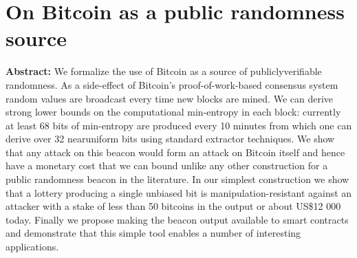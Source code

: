 \section{On Bitcoin as a public randomness source}

\textbf{Abstract:} 
We formalize the use of Bitcoin as a source of publiclyverifiable randomness. As a side-effect of Bitcoin’s proof-of-work-based consensus system random values are broadcast every time new blocks are mined. We can derive strong lower bounds on the computational min-entropy in each block: currently at least 68 bits of min-entropy are produced every 10 minutes from which one can derive over 32 nearuniform bits using standard extractor techniques. We show that any attack on this beacon would form an attack on Bitcoin itself and hence have a monetary cost that we can bound unlike any other construction for a public randomness beacon in the literature. In our simplest construction we show that a lottery producing a single unbiased bit is manipulation-resistant against an attacker with a stake of less than 50 bitcoins in the output or about US\$12 000 today. Finally we propose making the beacon output available to smart contracts and demonstrate that this simple tool enables a number of interesting applications.
